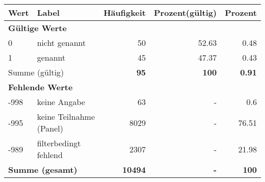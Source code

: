      \begin{longtable}{lXrrr}
     \toprule
     \textbf{Wert} & \textbf{Label} & \textbf{Häufigkeit} & \textbf{Prozent(gültig)} & \textbf{Prozent} \\
     \endhead
     \midrule
     \multicolumn{5}{l}{\textbf{Gültige Werte}}\\

     0 &
     \multicolumn{1}{X}{ nicht genannt   } &


       \num{50} &
       \num[round-mode=places,round-precision=2]{52,63} &
         \num[round-mode=places,round-precision=2]{0,48} \\

     1 &
     \multicolumn{1}{X}{ genannt   } &


       \num{45} &
       \num[round-mode=places,round-precision=2]{47,37} &
         \num[round-mode=places,round-precision=2]{0,43} \\
     \midrule
     \multicolumn{2}{l}{Summe (gültig)} &
       \textbf{\num{95}} &
     \textbf{100} &
       \textbf{\num[round-mode=places,round-precision=2]{0,91}} \\
     \multicolumn{5}{l}{\textbf{Fehlende Werte}}\\
       -998 &
       keine Angabe &
         \num{63} &
        - &
         \num[round-mode=places,round-precision=2]{0,6} \\
       -995 &
       keine Teilnahme (Panel) &
         \num{8029} &
        - &
         \num[round-mode=places,round-precision=2]{76,51} \\
       -989 &
       filterbedingt fehlend &
         \num{2307} &
        - &
         \num[round-mode=places,round-precision=2]{21,98} \\
     \midrule
     \multicolumn{2}{l}{\textbf{Summe (gesamt)}} &
          \textbf{\num{10494}} &
        \textbf{-} &
        \textbf{100} \\
     \bottomrule
     \end{longtable}
     
